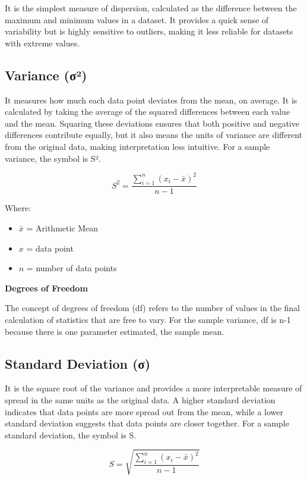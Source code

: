 \documentclass[
]{book}
\providecommand{\tightlist}{%
  \setlength{\itemsep}{0pt}\setlength{\parskip}{0pt}}
\begin{document}
It is the simplest measure of dispersion, calculated as the difference between the maximum and minimum values in a dataset. It provides a quick sense of variability but is highly sensitive to outliers, making it less reliable for datasets with extreme values.

\subsection{Variance (σ²)}\label{variance-ux3c3uxb2}

It measures how much each data point deviates from the mean, on average. It is calculated by taking the average of the squared differences between each value and the mean. Squaring these deviations ensures that both positive and negative differences contribute equally, but it also means the units of variance are different from the original data, making interpretation less intuitive. For a sample variance, the symbol is S².

\[S^2 = \frac{\sum_{i=1}^{n} (x_i - \bar{x})^2}{n-1}\]

Where:

\begin{itemize}
\tightlist
\item
  \(\bar{x}\) = Arithmetic Mean
\item
  \(x\) = data point
\item
  \(n\) = number of data points
\end{itemize}

\textbf{Degrees of Freedom}

The concept of degrees of freedom (df) refers to the number of values in the final calculation of statistics that are free to vary. For the sample variance, df is n-1 because there is one parameter estimated, the sample mean.

\subsection{Standard Deviation (σ)}\label{standard-deviation-ux3c3}

It is the square root of the variance and provides a more interpretable measure of spread in the same units as the original data. A higher standard deviation indicates that data points are more spread out from the mean, while a lower standard deviation suggests that data points are closer together. For a sample standard deviation, the symbol is S.

\[S = \sqrt{\frac{\sum_{i=1}^{n} (x_i - \bar{x})^2}{n-1}}\]
\end{document}
